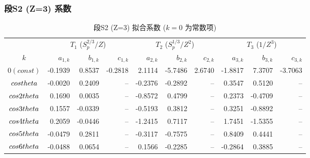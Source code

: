 \subsubsection*{段S2 (Z=3) 系数}
\begin{table}[h]
  \centering
  \caption{段S2 (Z=3) 拟合系数 ($k=0$ 为常数项)}
  \begin{tabular}{c|rrr|rrr|rrr}
    \hline
    \multicolumn{1}{c|}{} & \multicolumn{3}{c|}{$T_1$ ($S_p^{2/3}/Z$)} & \multicolumn{3}{c|}{$T_2$ ($S_p^{1/3}/Z^2$)} & \multicolumn{3}{c}{$T_3$ ($1/Z^3$)} \\
    $k$ & $a_{1,k}$ & $b_{1,k}$ & $c_{1,k}$ & $a_{2,k}$ & $b_{2,k}$ & $c_{2,k}$ & $a_{3,k}$ & $b_{3,k}$ & $c_{3,k}$ \\
    \hline
    $0 (const)$ & -0.1939 & 0.8537 & -0.2818 & 2.1114 & -5.7486 & 2.6740 & -1.8817 & 7.3707 & -3.7063 \\
    $\\cos\\theta$ & -0.0020 & 0.2409 & -- & -0.2376 & -0.2892 & -- & 0.3547 & 0.5120 & -- \\
    $\\cos2\\theta$ & 0.1690 & 0.0035 & -- & -0.8572 & 0.4799 & -- & 0.2373 & -0.4709 & -- \\
    $\\cos3\\theta$ & 0.1557 & -0.0339 & -- & -0.5193 & 0.3812 & -- & 0.3251 & -0.8892 & -- \\
    $\\cos4\\theta$ & 0.2059 & -0.0446 & -- & -1.2415 & 0.7117 & -- & 1.7451 & -1.5355 & -- \\
    $\\cos5\\theta$ & -0.0479 & 0.2811 & -- & -0.3117 & -0.7575 & -- & 0.8409 & 0.4441 & -- \\
    $\\cos6\\theta$ & -0.0488 & 0.0654 & -- & 0.1566 & -0.2285 & -- & -0.2864 & 0.3885 & -- \\
    \hline
  \end{tabular}
\end{table}

